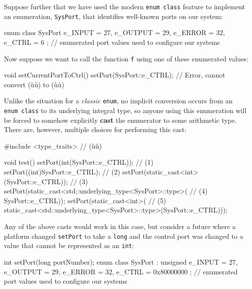\noindent Suppose further that we have used the modern
\texttt{enum}~\texttt{class} feature to implement an enumeration,
\texttt{SysPort}, that identifies well-known ports on our system:

\begin{emcppslisting}[emcppsbatch=e11]
enum class SysPort { e_INPUT = 27, e_OUTPUT = 29, e_ERROR = 32, e_CTRL = 6 };
    // enumerated port values used to configure our systems
\end{emcppslisting}

\noindent Now suppose we want to call the function \texttt{f} using one of these
enumerated values:

\begin{emcppslisting}[emcppsbatch=e11]
void setCurrentPortToCtrl()
{
    setPort(SysPort::e_CTRL);  // Error, cannot convert (ù{}ù) to (ù{}ù)
}
\end{emcppslisting}

\noindent Unlike the situation for a \emph{classic} \texttt{enum}, no implicit
conversion occurs from an \texttt{enum}~\texttt{class} to its underlying
integral type, so anyone using this enumeration will be forced to
somehow explicitly \textbf{cast} the enumerator to some arithmetic type.
There are, however, multiple choices for performing this cast:

\begin{emcppslisting}[emcppsbatch=e11]
#include <type_traits>  // (ù{}ù)

void test()
{
    setPort(int(SysPort::e_CTRL));                                       // (1)
    setPort((int)SysPort::e_CTRL);                                       // (2)
    setPort(static_cast<int>(SysPort::e_CTRL));                          // (3)
    setPort(static_cast<std::underlying_type<SysPort>::type>(            // (4)
                                                         SysPort::e_CTRL));
    setPort(static_cast<int>(                                            // (5)
             static_cast<std::underlying_type<SysPort>::type>(SysPort::e_CTRL)));
}
\end{emcppslisting}

\noindent Any of the above casts would work in this case, but consider a future
where a platform changed \texttt{setPort} to take a \texttt{long} and
the control port was changed to a value that cannot be represented as an
\texttt{int}:

\begin{emcppslisting}
int setPort(long portNumber);
enum class SysPort : unsigned { e_INPUT = 27, e_OUTPUT = 29, e_ERROR = 32,
                                e_CTRL = 0x80000000 };
    // enumerated port values used to configure our systems
\end{emcppslisting}

